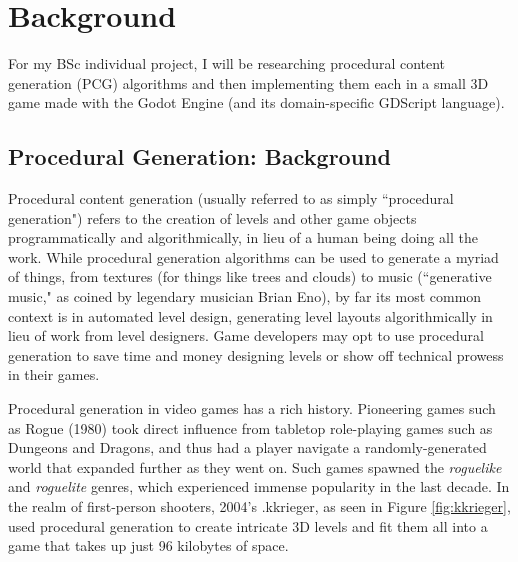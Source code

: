 \chapter{Background} \label{Background}

For my BSc individual project, I will be researching procedural content generation (PCG) algorithms and then implementing them each in a small 3D game made with the Godot Engine (and its domain-specific GDScript language).

\section{Procedural Generation: Background}

Procedural content generation (usually referred to as simply ``procedural generation") refers to the creation of levels and other game objects programmatically and algorithmically, in lieu of a human being doing all the work. While procedural generation algorithms can be used to generate a myriad of things, from textures (for things like trees and clouds) to music (``generative music," as coined by legendary musician Brian Eno), by far its most common context is in automated level design, generating level layouts algorithmically in lieu of work from level designers. Game developers may opt to use procedural generation to save time and money designing levels or show off technical prowess in their games.

Procedural generation in video games has a rich history. Pioneering games such as Rogue (1980) took direct influence from tabletop role-playing games such as Dungeons and Dragons, and thus had a player navigate a randomly-generated world that expanded further as they went on. Such games spawned the \emph{roguelike} and \emph{roguelite} genres, which experienced immense popularity in the last decade. In the realm of first-person shooters, 2004's .kkrieger, as seen in Figure \ref{fig:kkrieger}, used procedural generation to create intricate 3D levels and fit them all into a game that takes up just 96 kilobytes of space. 

